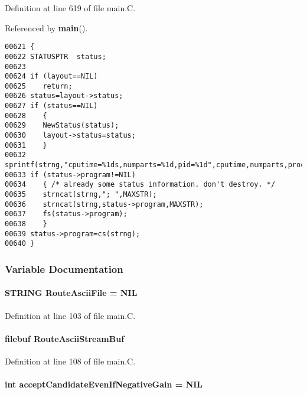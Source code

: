 Definition at line 619 of file main.C.

Referenced by {\bf main}().\small\begin{verbatim}00621 {
00622 STATUSPTR  status;
00623 
00624 if (layout==NIL)
00625    return;
00626 status=layout->status;
00627 if (status==NIL)
00628    {
00629    NewStatus(status);
00630    layout->status=status;
00631    }
00632 sprintf(strng,"cputime=%1ds,numparts=%1d,pid=%1d",cputime,numparts,processid);
00633 if (status->program!=NIL)
00634    { /* already some status information. don't destroy. */
00635    strncat(strng,"; ",MAXSTR);
00636    strncat(strng,status->program,MAXSTR);
00637    fs(status->program);
00638    }
00639 status->program=cs(strng);
00640 }
\end{verbatim}\normalsize 


\subsubsection{Variable Documentation}
\label{main.C_a47}
\paragraph{\setlength{\rightskip}{0pt plus 5cm}STRING Route\-Ascii\-File = NIL}\hfill



Definition at line 103 of file main.C.\label{main.C_a50}
\paragraph{\setlength{\rightskip}{0pt plus 5cm}filebuf Route\-Ascii\-Stream\-Buf}\hfill



Definition at line 108 of file main.C.\label{main.C_a33}
\paragraph{\setlength{\rightskip}{0pt plus 5cm}int accept\-Candidate\-Even\-If\-Negative\-Gain = NIL}\hfill



